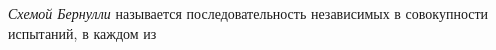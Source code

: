 \begin{to_def}
    \textit{Схемой Бернулли} называется последовательность независимых в совокупности испытаний, в каждом из 
\end{to_def}